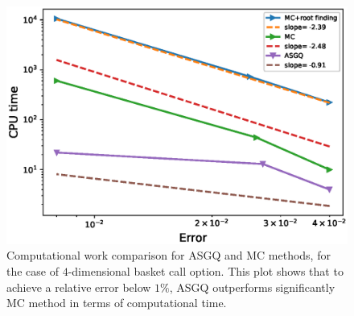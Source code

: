 \FloatBarrier


	\begin{figure}[h!]
\centering
\includegraphics[width=0.4\linewidth]{./figures/basket_call_4d_time_stepping/complexity_rates/error_vs_time}

\caption{Computational work comparison for ASGQ and MC methods, for the case of $4$-dimensional basket call option. This plot shows that to achieve a relative error below $1\%$, ASGQ outperforms significantly MC method in terms of computational time.}
\label{fig:Complexity plot for MC and MISC , 4 dim basket call non rich}
\end{figure}


\FloatBarrier

%
%
%




